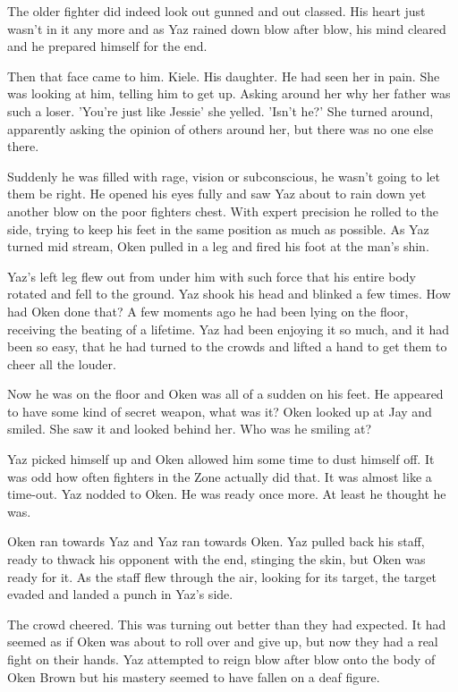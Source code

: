 The older fighter did indeed look out gunned and out classed.  His heart just wasn't in it any more and as Yaz rained down blow after blow, his mind cleared and he prepared himself for the end.  

Then that face came to him.  Kiele.  His daughter.  He had seen her in pain.  She was looking at him, telling him to get up.  Asking around her why her father was such a loser.  'You're just like Jessie' she yelled.  'Isn't he?'  She turned around, apparently asking the opinion of others around her, but there was no one else there.  

Suddenly he was filled with rage, vision or subconscious, he wasn't going to let them be right.  He opened his eyes fully and saw Yaz about to rain down yet another blow on the poor fighters chest.  With expert precision he rolled to the side, trying to keep his feet in the same position as much as possible.  As Yaz turned mid stream, Oken pulled in a leg and fired his foot at the man's shin.

Yaz's left leg flew out from under him with such force that his entire body rotated and fell to the ground.  Yaz shook his head and blinked a few times.  How had Oken done that?  A few moments ago he had been lying on the floor, receiving the beating of a lifetime.  Yaz had been enjoying it so much, and it had been so easy, that he had turned to the crowds and lifted a hand to get them to cheer all the louder.

Now he was on the floor and Oken was all of a sudden on his feet.  He appeared to have some kind of secret weapon, what was it?  Oken looked up at Jay and smiled.  She saw it and looked behind her.  Who was he smiling at?

Yaz picked himself up and Oken allowed him some time to dust himself off.  It was odd how often fighters in the Zone actually did that.  It was almost like a time-out.  Yaz nodded to Oken.  He was ready once more.  At least he thought he was.  

Oken ran towards Yaz and Yaz ran towards Oken.  Yaz pulled back his staff, ready to thwack his opponent with the end, stinging the skin, but Oken was ready for it.  As the staff flew through the air, looking for its target, the target evaded and landed a punch in Yaz's side.

The crowd cheered.  This was turning out better than they had expected.  It had seemed as if Oken was about to roll over and give up, but now they had a real fight on their hands.  Yaz attempted to reign blow after blow onto the body of Oken Brown but his mastery seemed to have fallen on a deaf figure.

